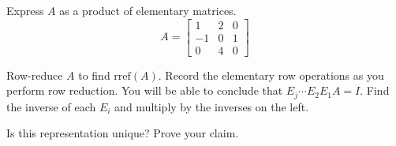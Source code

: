 \documentclass{ximera}
\begin{document}


\begin{problem}\label{prob:prodelemmatrices}
Express $A$ as a product of elementary matrices.
$$A=\begin{bmatrix}1&2&0\\-1&0&1\\0&4&0\end{bmatrix}$$
\begin{hint}
Row-reduce $A$ to find $\mbox{rref}(A)$.  Record the elementary row operations as you perform row reduction.  You will be able to conclude that $E_j\cdots E_2E_1A=I$.  Find the inverse of each $E_i$ and multiply by the inverses on the left.
\end{hint}
Is this representation unique?  Prove your claim.
\end{problem}

\end{document}
